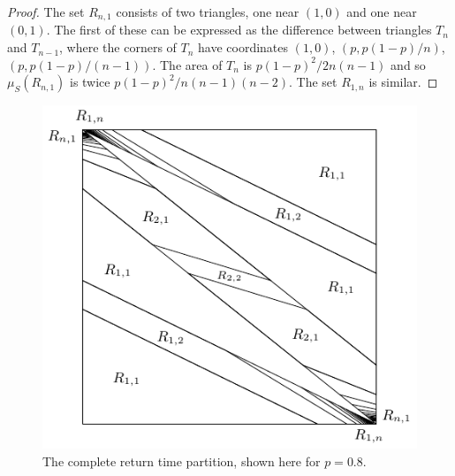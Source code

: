 \documentclass{iopart}
\begin{document}
\begin{proof}
The set $R_{n,1}$ consists of two triangles, one near $(1,0)$ and one near $(0,1)$. The first of these can be expressed as the difference between triangles $T_n$ and $T_{n-1}$, where the corners of $T_n$ have coordinates $(1,0)$, $(p,p(1-p)/n)$, $(p,p(1-p)/(n-1))$. The area of $T_n$ is $p(1-p)^2/2n(n-1)$ and so $\mu_S(R_{n,1})$ is twice $p(1-p)^2/n(n-1)(n-2)$. The set $R_{1,n}$ is similar.
\end{proof}

\begin{figure}
	\centering
	
\includegraphics{R}
	\caption{The complete return time partition, shown here for $p=0.8$.  }
	\label{fig:R}
\end{figure}
\end{document}
